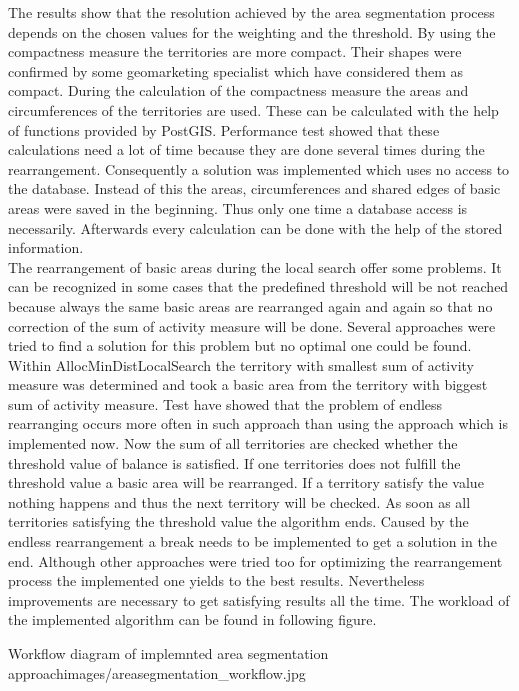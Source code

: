 The results show that the resolution achieved by the area segmentation process depends on the chosen values for the weighting and the threshold. By using the compactness measure the territories are more compact. Their shapes were confirmed by some geomarketing specialist which have considered them as compact. During the calculation of the compactness measure the areas and circumferences of the territories are used. These can be calculated with the help of functions provided by PostGIS. Performance test showed that these calculations need a lot of time because they are done several times during the rearrangement. Consequently a solution was implemented which uses no access to the database. Instead of this the areas, circumferences and shared edges of basic areas were saved in the beginning. Thus only one time a database access is necessarily. Afterwards every calculation can be done with the help of the stored information. \\
The rearrangement of basic areas during the local search offer some problems. It can be recognized in some cases that the predefined threshold will be not reached because always the same basic areas are rearranged again and again so that no correction of the sum of activity measure will be done. Several approaches were tried to find a solution for this problem but no optimal one could be found. Within AllocMinDistLocalSearch the territory with smallest sum of activity measure was determined and took a basic area from the territory with biggest sum of activity measure. Test have showed that the problem of endless rearranging occurs more often in such approach than using the approach which is implemented now. Now the sum of all territories are checked whether the threshold value of balance is satisfied. If one territories does not fulfill the threshold value a basic area will be rearranged. If a territory satisfy the value nothing happens and thus the next territory will be checked. As soon as all territories satisfying the threshold value the algorithm ends. Caused by the endless rearrangement a break needs to be implemented to get a solution in the end. Although other approaches were tried too for optimizing the rearrangement process the implemented one yields to the best results. Nevertheless improvements are necessary to get satisfying results all the time. The workload of the implemented algorithm can be found in following figure. 

\begin{figureOwn}{Workflow diagram of implemnted area segmentation approach}{images/areasegmentation_workflow.jpg}\end{figureOwn}

